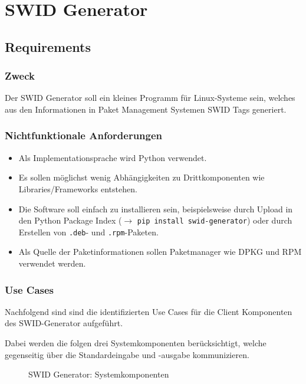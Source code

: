 \chapter{SWID Generator}

\section{Requirements}

\subsection{Zweck}

Der SWID Generator soll ein kleines Programm für Linux-Systeme sein, welches aus
den Informationen in Paket Management Systemen SWID Tags generiert.

\subsection{Nichtfunktionale Anforderungen}

\begin{itemize}
		\item Als Implementationsprache wird Python verwendet.
		\item Es sollen möglichst wenig Abhängigkeiten zu Drittkomponenten wie
			Libraries/Frameworks entstehen.
    \item Die Software soll einfach zu installieren sein, beispielsweise durch
			Upload in den Python Package Index ($\rightarrow$ \texttt{pip install
			swid-generator}) oder durch Erstellen von \texttt{.deb}- und
			\texttt{.rpm}-Paketen.
		\item Als Quelle der Paketinformationen sollen Paketmanager wie DPKG und RPM
			verwendet werden.
\end{itemize}

\subsection{Use Cases}

Nachfolgend sind sind die identifizierten Use Cases für die Client Komponenten
des SWID-Generator aufgeführt.

Dabei werden die folgen drei Systemkomponenten berücksichtigt, welche
gegenseitig über die Standardeingabe und -ausgabe kommunizieren.

\vspace{1em}

\begin{figure}[H]
	\centering
	
	\caption{SWID Generator: Systemkomponenten}
	\label{img:swid-generator-aktoren}
\end{figure}

